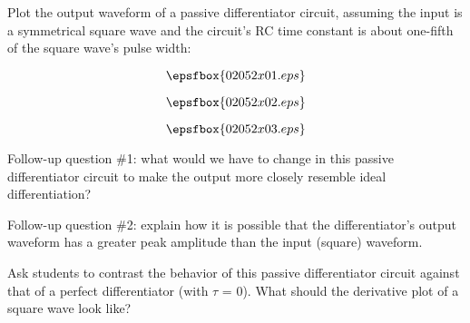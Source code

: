 

Plot the output waveform of a passive differentiator circuit, assuming the input is a symmetrical square wave and the circuit's RC time constant is about one-fifth of the square wave's pulse width:

$$\epsfbox{02052x01.eps}$$

$$\epsfbox{02052x02.eps}$$







$$\epsfbox{02052x03.eps}$$

\vskip 10pt

Follow-up question \#1: what would we have to change in this passive differentiator circuit to make the output more closely resemble ideal differentiation?

\vskip 10pt

Follow-up question \#2: explain how it is possible that the differentiator's output waveform has a greater peak amplitude than the input (square) waveform.







Ask students to contrast the behavior of this passive differentiator circuit against that of a perfect differentiator (with $\tau$ = 0).  What should the derivative plot of a square wave look like?




